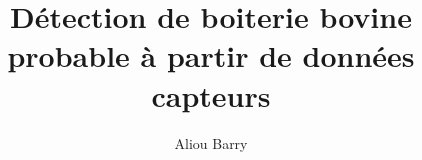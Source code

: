 \documentclass[11pt]{memoireuqamV2}
\begin{document}
\title{Détection de boiterie bovine probable à partir de données capteurs}
\author{Aliou Barry}
\uqammemoire %
{}


\thispagestyle{empty}        %
\maketitle
{}




\tableofcontents %
\listoffigures
\listoftables
















\appendix %




\end{document}
